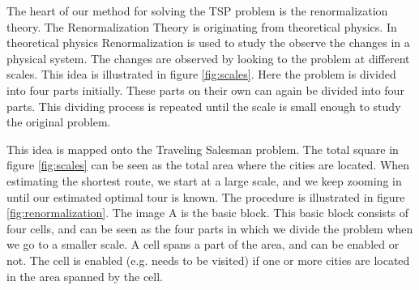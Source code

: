 The heart of our method for solving the TSP problem is the renormalization
theory. The Renormalization Theory is originating from theoretical physics. In
theoretical physics Renormalization is used to study the observe the changes in
a physical system. The changes are observed by looking to the problem at
different scales. This idea is illustrated in figure \ref{fig:scales}. Here the
problem is divided into four parts initially. These parts on their own can
again be divided into four parts. This dividing process is repeated until the
scale is small enough to study the original problem.

This idea is mapped onto the Traveling Salesman problem. The total square in
figure \ref{fig:scales} can be seen as the total area where the cities are
located. When estimating the shortest route, we start at a large scale, and we
keep zooming in until our estimated optimal tour is known. The procedure is
illustrated in figure \ref{fig:renormalization}. The image A is the basic
block. This basic block consists of four cells, and can be seen as the four
parts in which we divide the problem when we go to a smaller scale. A cell
spans a part of the area, and can be enabled or not. The cell is enabled (e.g.
needs to be visited) if one or more cities are located in the area spanned by
the cell.

